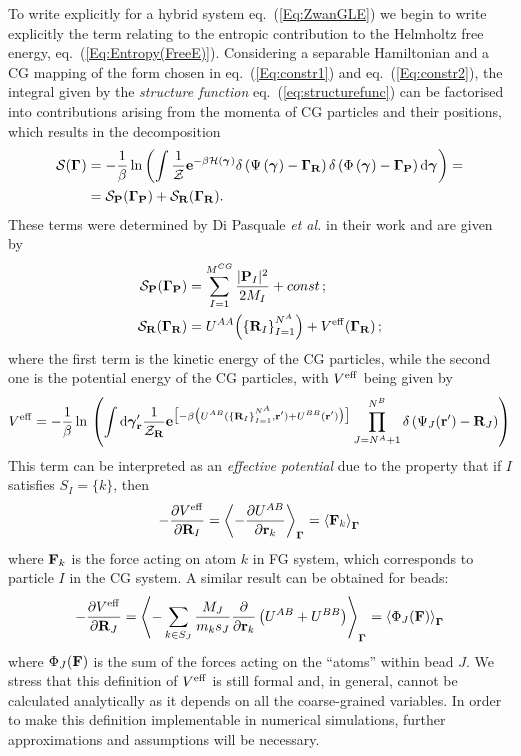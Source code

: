 \documentclass[10pt,a4paper]{book}
\theoremstyle{definition}
\begin{document}
To write explicitly for a hybrid system eq.~(\ref{Eq:ZwanGLE}) we begin to write explicitly the term relating to the entropic contribution to the Helmholtz free energy,  eq.~(\ref{Eq:Entropy(FreeE)}). Considering a separable Hamiltonian and a CG mapping of the form chosen in eq.~(\ref{Eq:constr1}) and eq.~(\ref{Eq:constr2}), the integral given by the \emph{structure function} eq.~(\ref{eq:structurefunc}) can be factorised into contributions arising from the momenta of CG particles and their positions, which results in the decomposition
\begin{align*}
  \mathcal{S}(\boldsymbol\Gamma_{}) &= -\frac{1}{\beta}\ln{}\biggl(
  \int{\frac{1}{\mathcal{Z}} \mathbf{e}^{{-\beta \mathcal{H}(\boldsymbol\gamma_{})}}} 
    \delta\left({\Psi\left(\boldsymbol\gamma_{}\right)-\boldsymbol\Gamma_{\mathbf{R}}}\right)\delta\left({\Phi\left(\boldsymbol\gamma_{}\right)-\boldsymbol\Gamma_{\mathbf{P}}}\right)\mbox{d}\boldsymbol\gamma_{}
    \biggr) = \\ 
    &= \mathcal{S}_{\mathbf{P}}(\boldsymbol\Gamma_{\mathbf{P}})+ \mathcal{S}_{\mathbf{R}}(\boldsymbol\Gamma_{\mathbf{R}}).   \nonumber 
\end{align*}
These terms were determined by Di Pasquale \textit{et al.} in their work \cite{DiPasquale2019} and are given by 
\begin{align}
 \label{Eq:MomB}
 \mathcal{S}_{\mathbf{P}}(\boldsymbol\Gamma_{\mathbf{P}}) & = {\sum_{I=1}^{M^{CG}}{\frac{|\mathbf{P}_{I}|^2}{2M_{I}}}} + const\,;\\
 \label{Eq:EntrInt}
 \mathcal{S}_{\mathbf{R}}(\boldsymbol\Gamma_{\mathbf{R}}) &= U^{AA}\Big(\{\mathbf{R}_I\}_{I=1}^{N_{}^A}\Big) + V^{\mathrm{eff}}(\boldsymbol\Gamma_{\mathbf{R}})\,;
\end{align}
where the first term is the kinetic energy of the CG particles, while the second one is the potential energy of the CG particles, with $V^{\mathrm{eff}}$ being given by
\begin{equation*}
 V^{\mathrm{eff}} = - \frac{1}{\beta} \ln{}  \left(\int{\mbox{d}\boldsymbol\gamma_{\mathbf{r}}' \frac{1}{\mathcal{\mathcal{Z}_{\mathbf{R}}}}
    \mathbf{e}^{\big[{{-\beta \big(U^{AB}(\{\mathbf{R}_I\}_{I=1}^{N_{}^A},\mathbf{r}') +U^{BB}(\mathbf{r}') \big)}\big]}}}
    \prod_{J=N_{}^A+1}^{N_{}^B}\delta\left({\Psi_{J}(\mathbf{r}')-\mathbf{R}_{J}}\right)\right)
\end{equation*}
This term can be interpreted as an \emph{effective potential} due to the property that if $I$ satisfies $S_I=\{k\}$, then
%
\begin{equation}\label{Eq:ForceAt}
	-\frac{\partial V^{\mathrm{eff}}}{\partial\mathbf{R}_I} = \left\langle-\frac{\partial U^{AB}}{\partial\mathbf{r}_k}\right\rangle_{\boldsymbol\Gamma_{}} =  \left\langle\mathbf{F}_k\right\rangle_{\boldsymbol\Gamma_{}}
\end{equation}
%
where $\mathbf{F}_k$ is the force acting on atom $k$ in FG system, which corresponds to particle $I$ in the CG system.
A similar result can be obtained for beads:
%
\begin{equation}\label{Eq:VeffB}
	-\frac{\partial V^{\mathrm{eff}}}{\partial\mathbf{R}_{J}} = \left\langle-\sum_{k\in S_J}\frac{M_J}{m_k s_J}\frac{\partial}{\partial\mathbf{r}_k}\left(U^{AB}+U^{BB}\right)\right\rangle_{\boldsymbol\Gamma_{}} 
	= \left\langle\Phi_J(\mathbf{F})\right\rangle_{\boldsymbol\Gamma_{}}
\end{equation}
%
where $\Phi_J(\mathbf{F})$ is the sum of the forces acting on the ``atoms'' within bead $J$. We stress that this definition of $V^{\mathrm{eff}}$ is still formal and, in general, cannot be calculated analytically as it depends on all the coarse-grained variables. In order to make this definition implementable in numerical simulations, further approximations and assumptions will be necessary.
\end{document}
